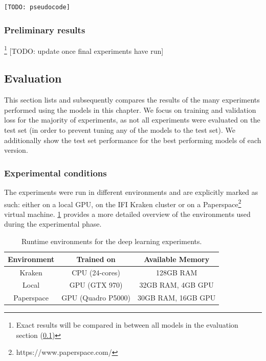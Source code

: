 \begin{figure}[h]
\end{figure}

\begin{lstlisting}[language=Python]
  [TODO: pseudocode]
\end{lstlisting}

\subsubsection{Preliminary results}{\footnote{Exact results will be compared in between all models in the evaluation section (\cref{sst:nn_results})}}
\label{ssst:nn_e4_results}
[TODO: update once final experiments have run]


\clearpage
\subsection{Evaluation}
\label{sst:nn_results}
This section lists and subsequently compares the results of the many experiments performed using the models in this chapter. We focus on training and validation loss for the majority of experiments, as not all experiments were evaluated on the test set (in order to prevent tuning any of the models to the test set). We additionally show the test set performance for the best performing models of each version.

\subsubsection{Experimental conditions}
\label{ssst:experimental_conditions}
The experiments were run in different environments and are explicitly marked as such: either on a local GPU, on the IFI Kraken cluster or on a Paperspace\footnote{https://www.paperspace.com/} virtual machine. \cref{tab:experimental_environments} provides a more detailed overview of the environments used during the experimental phase.

\begin{table}[h]
  \centering
  \begin{tabular}{ |c|c|c| }
    \hline
    Environment & Trained on & Available Memory \\
    \hline
    Kraken & CPU (24-cores) & 128GB RAM \\
    Local & GPU (GTX 970) & 32GB RAM, 4GB GPU \\
    Paperspace & GPU (Quadro P5000) & 30GB RAM, 16GB GPU \\
    \hline
  \end{tabular}
  \caption{Runtime environments for the deep learning experiments.}
  \label{tab:experimental_environments}
\end{table}

